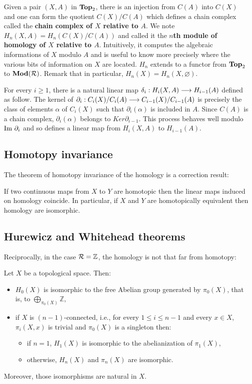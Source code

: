 Given a pair $(X,A)$ in $\textbf{Top}_2$, there is an injection from $C(A)$ into $C(X)$ and one can form the quotient $C(X)/C(A)$ which defines a chain complex called the \textbf{chain complex of $X$ relative to $A$}. We note $H_n(X,A) = H_n(C(X)/C(A))$ and called it the \textbf{$n$th module of homology of $X$ relative to $A$}. Intuitively, it computes the algebraic informations of $X$ modulo $A$ and is useful to know more precisely where the various bits of information on $X$ are located. $H_n$ extends to a functor from $\textbf{Top}_2$ to $\textbf{Mod}(\mathcal{R})$. Remark that in particular, $H_n(X) = H_n(X,\varnothing)$.

For every $i \geq 1$, there is a natural linear map $\delta_i : H_i(X,A) \longrightarrow H_{i-1}(A)$ defined as follow. The kernel of $\partial_i : C_i(X)/C_i(A) \longrightarrow C_{i-1}(X)/C_{i-1}(A)$ is precisely the class of elements $\alpha$ of $C_i(X)$ such that $\partial_i(\alpha)$ is included in $A$. Since $C(A)$ is a chain complex, $\partial_i(\alpha)$ belongs to $Ker \partial_{i-1}$. This process behaves well modulo $\text{Im }\partial_i$ and so defines a linear map from $H_i(X,A)$ to $H_{i-1}(A)$.


\subsection{Homotopy invariance}
\label{subsec:hominv}

The theorem of homotopy invariance of the homology is a correction result:

\begin{theo} If two continuous maps from $X$ to $Y$ are homotopic then the linear maps induced on homology coincide. In particular, if $X$ and $Y$ are homotopically equivalent then homology are isomorphic.\end{theo}

\subsection{Hurewicz and Whitehead theorems}
\label{subsec:hurwhi}

Reciprocally, in the case $\mathcal{R} = \mathbb{Z}$, the homology is not that far from homotopy:

\begin{theo} Let $X$ be a topological space. Then:
\begin{itemize}
	\item $H_0(X)$ is isomorphic to the free Abelian group generated by $\pi_0(X)$, that is, to $\bigoplus\limits_{\pi_0(X)}\mathbb{Z}$,
	\item if $X$ is $(n-1)$-connected, i.e., for every $1\leq i \leq n-1$ and every $x\in X$, $\pi_i(X,x)$ is trivial and $\pi_0(X)$ is a singleton then: 
		\begin{itemize}
			\item if $n=1$, $H_1(X)$ is isomorphic to the abelianization of $\pi_1(X)$,
			\item otherwise, $H_n(X)$ and $\pi_n(X)$ are isomorphic.
		\end{itemize}
\end{itemize}
Moreover, those isomorphisms are natural in $X$.
\end{theo}

